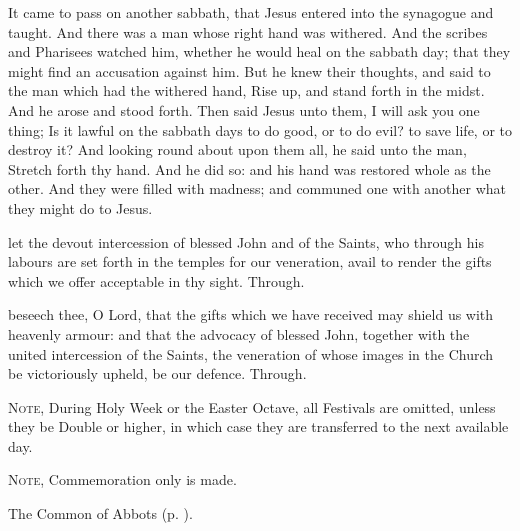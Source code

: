  It came to pass on another sabbath, that Jesus entered into the synagogue and taught. And there was a man whose right hand was withered. And the scribes and Pharisees watched him, whether he would heal on the sabbath day; that they might find an accusation against him. But he knew their thoughts, and said to the man which had the withered hand, Rise up, and stand forth in the midst. And he arose and stood forth. Then said Jesus unto them, I will ask you one thing; Is it lawful on the sabbath days to do good, or to do evil? to save life, or to destroy it? And looking round about upon them all, he said unto the man, Stretch forth thy hand. And he did so: and his hand was restored whole as the other. And they were filled with madness; and communed one with another what they might do to Jesus.


\secret
{} let the devout intercession of blessed John and of the Saints, who through his labours are set forth in the temples for our veneration, avail to render the gifts which we offer acceptable in thy sight. Through.


\postcommunion
{} beseech thee, O Lord, that the gifts which we have received may shield us with heavenly armour: and that the advocacy of blessed John, together with the united intercession of the Saints, the veneration of whose images in the Church be victoriously upheld, be our defence. Through.

\begin{rubric}
    \textsc{Note,} During Holy Week or the Easter Octave, all Festivals are omitted, unless they be  Double or higher, in which case they are transferred to the next available day.
\end{rubric}



\begin{rubric}
	\textsc{Note,} Commemoration only is made.
\end{rubric}

\begin{rubric}
	The Common of Abbots (p. \pageref{CommonAbbots}).
\end{rubric}


